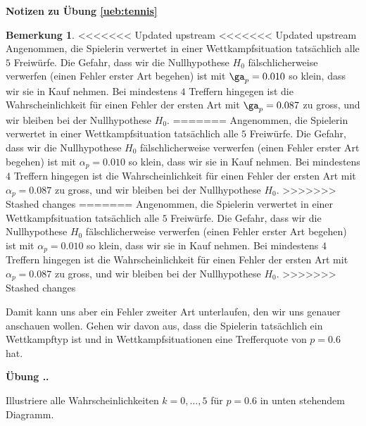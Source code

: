 \documentclass[%
<<<<<<< Updated upstream
<<<<<<< Updated upstream
11pt,%
twoside,%
titlepage,%
german,%
=======
=======
>>>>>>> Stashed changes
11pt,%
twoside,%
titlepage,%
swissgerman,%
<<<<<<< Updated upstream
>>>>>>> Stashed changes
=======
>>>>>>> Stashed changes
headsepline%
]{scrartcl}
\newcommand{\faEyeLightGray}{\textcolor{lightgray}{\faEye}} %
\newcommand{\faReturnGray}{\textcolor{gray}{\faMailReply}} %
\newcommand{\faEyeLightGray}{\textcolor{lightgray}{\faEye}} %
\theoremstyle{definition}
\newtheorem{bem}{Bemerkung}[subsection] %
\theoremstyle{plain}
\newcommand{\concatueb}[1]{ueb:#1}%
\newcommand{\concatlsg}[1]{lsg:#1}%
\newcounter{uebcounter}[section]
\renewcommand{\theuebcounter}{\thesection.\arabic{uebcounter}}  %
\newenvironment{lsg}[1]{%
    \par\noindent\textbf{Notizen zu Übung \ref{\concatueb{#1}}}\label{\concatlsg{#1}}
    \hfill\hyperref[\concatueb{#1}]{\faReturnGray}\par %
}{%
    \par%
}
\newenvironment{uebenv}[1]{%
    \refstepcounter{uebcounter}
    \par\noindent\textbf{Übung \theuebcounter.}%
    \label{\concatueb{#1}}\hfill\hyperref[\concatlsg{#1}]{\faEyeLightGray}\par
}{%
    \par
}
\newcounter{theo}[section]\setcounter{theo}{0}
\newcommand{\concatueb}[1]{ueb:#1}%
\newcommand{\concatlsg}[1]{lsg:#1}%
\newcounter{uebcounter}[section]
\renewcommand{\theuebcounter}{\thesection.\arabic{uebcounter}}  %
\newenvironment{lsg}[1]{%
    \par\noindent\textbf{Notizen zu Übung \ref{\concatueb{#1}}.}%
    \label{\concatlsg{#1}}
}{%
    \par%
}
\newenvironment{uebenv}[1]{%
    \refstepcounter{uebcounter}
    \par\noindent\textbf{Übung \theuebcounter.}%
    \label{\concatueb{#1}}\hfill\hyperref[\concatlsg{#1}]{\faEyeLightGray}\newline
}{%
    \par
}
\begin{document}
\begin{lsg}{tennis}
\begin{bem}
<<<<<<< Updated upstream
<<<<<<< Updated upstream
Angenommen, die Spielerin verwertet in einer Wettkampfsituation tatsächlich alle $5$ Freiwürfe. Die Gefahr, dass wir die Nullhypothese $H_0$ fälschlicherweise verwerfen (einen Fehler erster Art begehen) ist mit $\ga_p=0.010$ so klein, dass wir sie in Kauf nehmen. Bei mindestens $4$ Treffern hingegen ist die Wahrscheinlichkeit für einen Fehler der ersten Art mit $\ga_p=0.087$ zu gross, und wir bleiben bei der Nullhypothese $H_0$.
=======
Angenommen, die Spielerin verwertet in einer Wettkampfsituation tatsächlich alle $5$ Freiwürfe. Die Gefahr, dass wir die Nullhypothese $H_0$ fälschlicherweise verwerfen (einen Fehler erster Art begehen) ist mit $\alpha_p=0.010$ so klein, dass wir sie in Kauf nehmen. Bei mindestens $4$ Treffern hingegen ist die Wahrscheinlichkeit für einen Fehler der ersten Art mit $\alpha_p=0.087$ zu gross, und wir bleiben bei der Nullhypothese $H_0$.
>>>>>>> Stashed changes
=======
Angenommen, die Spielerin verwertet in einer Wettkampfsituation tatsächlich alle $5$ Freiwürfe. Die Gefahr, dass wir die Nullhypothese $H_0$ fälschlicherweise verwerfen (einen Fehler erster Art begehen) ist mit $\alpha_p=0.010$ so klein, dass wir sie in Kauf nehmen. Bei mindestens $4$ Treffern hingegen ist die Wahrscheinlichkeit für einen Fehler der ersten Art mit $\alpha_p=0.087$ zu gross, und wir bleiben bei der Nullhypothese $H_0$.
>>>>>>> Stashed changes

Damit kann uns aber ein Fehler zweiter Art unterlaufen, den wir uns genauer anschauen wollen. Gehen wir davon aus, dass die Spielerin tatsächlich ein Wettkampftyp ist und in Wettkampfsituationen eine Trefferquote von $p=0.6$ hat.

\begin{uebenv}{illustrierefehlerzweiterart}
Illustriere alle Wahrscheinlichkeiten $k=0,\dots,5$ für $p=0.6$ in unten stehendem Diagramm.

\begin{center}
\end{center}
\end{uebenv}
\end{bem}
\end{lsg}
\end{document}
